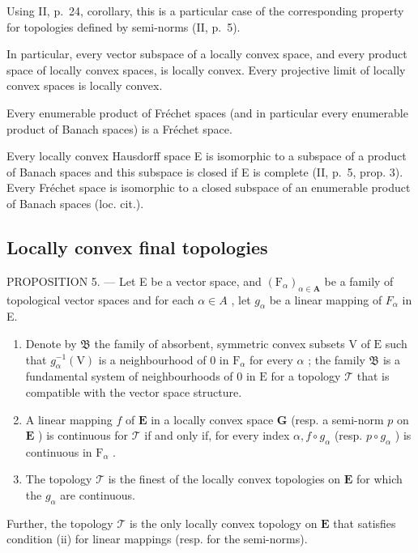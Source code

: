 Using II, p.~24, corollary, this is a particular case of the corresponding property for topologies defined by semi-norms (II, p.~5).

In particular, every vector subspace of a locally convex space, and every product space of locally convex spaces, is locally convex. Every projective limit of locally convex spaces is locally convex.

Every enumerable product of Fréchet spaces (and in particular every enumerable product of Banach spaces) is a Fréchet space.

Every locally convex Hausdorff space E is isomorphic to a subspace of a product of Banach spaces and this subspace is closed if E is complete (II, p.~5, prop. 3). Every Fréchet space is isomorphic to a closed subspace of an enumerable product of Banach spaces (loc. cit.).

\subsection{Locally convex final topologies}

PROPOSITION 5. --- Let E be a vector space, and \((\mathrm{F}_{\alpha})_{\alpha\in\mathbf{A}}\) be a family of topological vector spaces and for each \(\alpha\in A\) , let \(g_{\alpha}\) be a linear mapping of \(F_{\alpha}\) in E.

\begin{enumerate}
\def\labelenumi{(\roman{enumi})}
\item
  Denote by \(\mathfrak{B}\) the family of absorbent, symmetric convex subsets \(\mathrm{V}\) of \(\mathrm{E}\) such that \(g_{\alpha}^{-1}(\mathrm{V})\) is a neighbourhood of 0 in \(\mathrm{F}_{\alpha}\) for every \(\alpha\) ; the family \(\mathfrak{B}\) is a fundamental system of neighbourhoods of 0 in \(\mathrm{E}\) for a topology \(\mathcal{T}\) that is compatible with the vector space structure.
\item
  A linear mapping \(f\) of \(\mathbf{E}\) in a locally convex space \(\mathbf{G}\) (resp. a semi-norm \(p\) on \(\mathbf{E}\) ) is continuous for \(\mathcal{T}\) if and only if, for every index \(\alpha, f \circ g_{\alpha}\) (resp. \(p \circ g_{\alpha}\) ) is continuous in \(\mathrm{F}_{\alpha}\) .
\item
  The topology \(\mathcal{T}\) is the finest of the locally convex topologies on \(\mathbf{E}\) for which the \(g_{\alpha}\) are continuous.
\end{enumerate}

Further, the topology \(\mathcal{T}\) is the only locally convex topology on \(\mathbf{E}\) that satisfies condition (ii) for linear mappings (resp. for the semi-norms).

